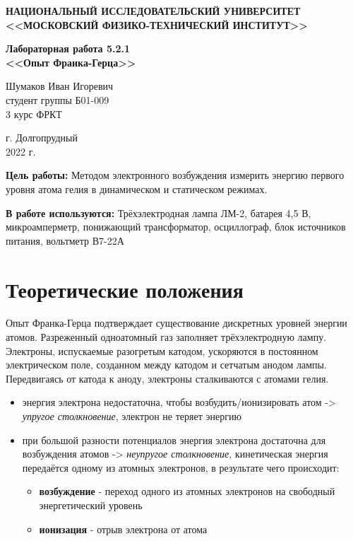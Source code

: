 \documentclass[a4paper,12pt]{article} %
\begin{document}
	
	
	\begin{center}
		
		\textbf{НАЦИОНАЛЬНЫЙ ИССЛЕДОВАТЕЛЬСКИЙ УНИВЕРСИТЕТ \\ <<МОСКОВСКИЙ ФИЗИКО-ТЕХНИЧЕСКИЙ ИНСТИТУТ>>}
		\vspace{13ex}
		
		\textbf{Лабораторная работа 5.2.1\\ <<Опыт Франка-Герца>>}
		\vspace{40ex}
		
		\normalsize{Шумаков Иван Игоревич \\ студент группы Б01-009\\ 3 курс ФРКТ\\}
	\end{center}
	
	\vfill 
	
	\begin{center}
		г. Долгопрудный\\ 
		2022 г.
	\end{center}
	
	
	\thispagestyle{empty} %
	\newpage

	\textbf{Цель работы:} Методом электронного возбуждения измерить энергию первого уровня атома гелия в динамическом и статическом режимах.\par
	\textbf{В работе используются:} Трёхэлектродная лампа ЛМ-2, батарея 4,5 В, микроамперметр, понижающий трансформатор, осциллограф, блок источников питания, вольтметр В7-22А\par
		
	\section{Теоретические положения}

		Опыт Франка-Герца подтверждает существование дискретных уровней энергии атомов. Разреженный одноатомный газ заполняет трёхэлектродную лампу. Электроны, испускаемые разогретым катодом, ускоряются в постоянном электрическом поле, созданном между катодом и сетчатым анодом лампы. Передвигаясь от катода к аноду, электроны сталкиваются с атомами гелия.
		\begin{itemize}
			\item энергия электрона недостаточна, чтобы возбудить/ионизировать атом -> \textit{упругое столкновение}, электрон не теряет энергию
			\item при большой разности потенциалов энергия электрона достаточна для возбуждения атомов -> \textit{неупругое столкновение}, кинетическая энергия передаётся одному из атомных электронов, в результате чего происходит:
			\begin{itemize}
				\item \textbf{возбуждение} - переход одного из атомных электронов на свободный энергетический уровень
				\item \textbf{ионизация} - отрыв электрона от атома 
			\end{itemize}
		\end{itemize}
\end{document}
